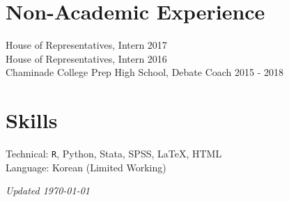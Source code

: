 \documentclass[margin, line]{res}
\begin{document}
\begin{resume}
\section{Non-Academic Experience}
House of Representatives, Intern \hfill 2017\\
House of Representatives, Intern \hfill 2016\\
Chaminade College Prep High School, Debate Coach \hfill 2015 - 2018

\section{Skills}
Technical: \texttt{R}, Python, Stata, SPSS, \LaTeX, HTML\\
Language: Korean (Limited Working)

\vspace*{\fill}

\hfill \small{\textit{Updated \today}}

\end{resume}
\end{document}

